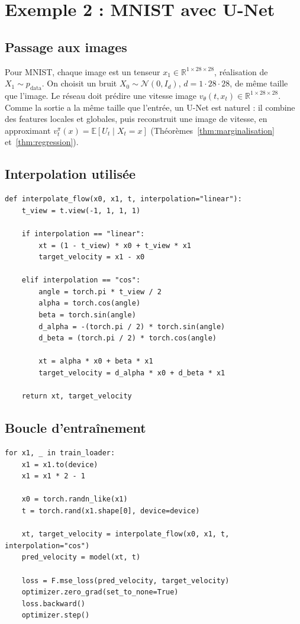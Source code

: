 \documentclass[11pt,a4paper]{article}
\theoremstyle{definition}
\theoremstyle{plain}
\theoremstyle{remark}
\newcommand{\R}{\mathbb{R}}
\newcommand{\E}{\mathbb{E}}
\begin{document}
\section{Exemple 2 : MNIST avec U-Net}

\subsection{Passage aux images}

Pour MNIST, chaque image est un tenseur $x_1\in\R^{1\times 28\times 28}$,
réalisation de $X_1\sim p_{\mathrm{data}}$. On choisit un bruit
$X_0\sim\mathcal{N}(0,I_d)$, $d=1\cdot28\cdot28$, de même taille que l'image. Le
réseau doit prédire une vitesse image $v_\theta(t,x_t)\in\R^{1\times 28\times 28}$.
Comme la sortie a la même taille que l'entrée, un U-Net est naturel : il combine
des features locales et globales, puis reconstruit une image de vitesse, en
approximant $v_t^\pi(x)=\E[U_t\mid X_t=x]$ (Théorèmes~\ref{thm:marginalisation}
et~\ref{thm:regression}).

\subsection{Interpolation utilisée}

\begin{lstlisting}[style=pythoncourse,caption={Interpolation linéaire ou cosinus pour MNIST}]
def interpolate_flow(x0, x1, t, interpolation="linear"):
    t_view = t.view(-1, 1, 1, 1)

    if interpolation == "linear":
        xt = (1 - t_view) * x0 + t_view * x1
        target_velocity = x1 - x0

    elif interpolation == "cos":
        angle = torch.pi * t_view / 2
        alpha = torch.cos(angle)
        beta = torch.sin(angle)
        d_alpha = -(torch.pi / 2) * torch.sin(angle)
        d_beta = (torch.pi / 2) * torch.cos(angle)

        xt = alpha * x0 + beta * x1
        target_velocity = d_alpha * x0 + d_beta * x1

    return xt, target_velocity
\end{lstlisting}

\subsection{Boucle d'entraînement}

\begin{lstlisting}[style=pythoncourse,caption={Étape d'entraînement flow matching sur MNIST}]
for x1, _ in train_loader:
    x1 = x1.to(device)
    x1 = x1 * 2 - 1

    x0 = torch.randn_like(x1)
    t = torch.rand(x1.shape[0], device=device)

    xt, target_velocity = interpolate_flow(x0, x1, t, interpolation="cos")
    pred_velocity = model(xt, t)

    loss = F.mse_loss(pred_velocity, target_velocity)
    optimizer.zero_grad(set_to_none=True)
    loss.backward()
    optimizer.step()
\end{lstlisting}
\end{document}
